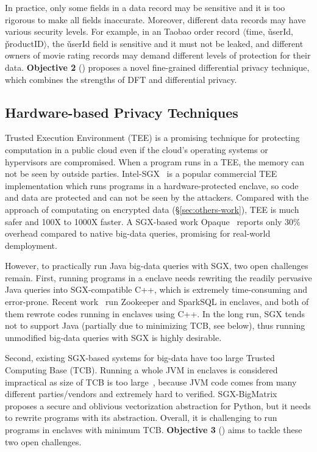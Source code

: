 In practice, only some fields in a data record may be sensitive and it is too 
rigorous to make all fields inaccurate. Moreover, different data records may 
have various security levels. For example, in an Taobao order record 
$\langle$\v{time}, \v{userId}, \v{productID}$\rangle$, the \v{userId} field is 
sensitive and it must not be leaked, and different owners of movie rating 
records may demand different levels of protection for their 
data. \textbf{Objective 2} () 
proposes a novel fine-grained differential privacy technique, which combines  
the strengths of DFT and differential privacy.



\vspace{-.15in}\subsection{Hardware-based Privacy Techniques}
\label{sec:sgx}\vspace{-.075in}

Trusted Execution Environment (TEE) is a promising technique for
protecting computation in a public cloud even if the cloud's operating systems 
or hypervisors are compromised. When a program runs in a TEE, the memory can 
not be seen by outside parties. Intel-SGX~\cite{intel-sgx} is a popular 
commercial TEE implementation which runs programs in a hardware-protected 
enclave, so code and data are protected and can not be seen by the attackers. 
Compared with the approach of computating on encrypted data 
(\S\ref{sec:others-work}), TEE is much safer and 100X to 1000X faster. A 
SGX-based work Opaque~\cite{opaque:nsdi17} reports only 30\% overhead compared 
to native big-data queries, promising for real-world demployment.

However, to practically run Java big-data queries with SGX, two open challenges 
remain. First, running programs in a enclave needs rewriting the readily 
pervasive Java queries into SGX-compatible C++, which is extremely 
time-consuming and error-prone. Recent work~\cite{securekeeper,opaque:nsdi17} 
run Zookeeper and SparkSQL in enclaves, and both of them rewrote codes running 
in enclaves using C++. In the long run, SGX tends not to support Java 
(partially due to minimizing TCB, see below), thus running unmodified big-data 
queries with SGX is highly desirable.

Second, existing SGX-based systems for big-data have too large Trusted 
Computing Base (TCB). Running a whole JVM in enclaves is considered impractical 
as size of TCB is too large~\cite{securekeeper}, because JVM code comes from 
many different parties/vendors and extremely hard to verified. 
SGX-BigMatrix~\cite{bigmatrix:ccs17} proposes a secure and oblivious 
vectorization abstraction for Python, but it needs to rewrite programs with its 
abstraction. Overall, it is challenging to run programs in enclaves 
with minimum TCB. \textbf{Objective 3} () aims to tackle these 
two open challenges.

